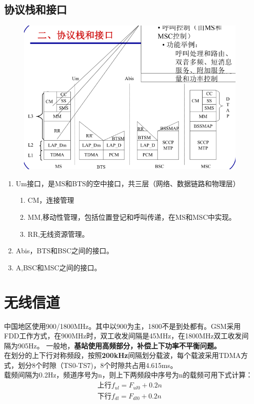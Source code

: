 \subsection{协议栈和接口}
\begin{figure}[H]
	\centering
	\includegraphics[width=0.7\linewidth]{figures/screenshot004}
	\caption{}
	\label{fig:screenshot004}
\end{figure}
\begin{enumerate}
	\item Um接口，是MS和BTS的空中接口，共三层（网络、数据链路和物理层）
	\begin{enumerate}
		\item CM，连接管理
		\item MM,移动性管理，包括位置登记和呼叫传递，在MS和MSC中实现。
		\item RR,无线资源管理。
	\end{enumerate}
	\item Abis，BTS和BSC之间的接口。
	\item A,BSC和MSC之间的接口。
\end{enumerate}
\section{无线信道}
中国地区使用900/1800MHz。其中以900为主，1800不是到处都有。GSM采用FDD工作方式，在900MHz时，双工收发间隔是45MHz，在1800MHz双工收发间隔为905Hz。
一般地，\textbf{基站使用高频部分，补偿上下功率不平衡问题。}\\
在划分的上下行对称频段，按照\textbf{200kHz}间隔划分载波，每个载波采用TDMA方式，划分8个时隙（TS0-TS7)，8个时隙共占用4.615ms。\\
载频间隔为0.2Hz，频道序号为n，则上下两频段中序号为n的载频可用下式计算：
\begin{gather}\label{key}
	\text{上行} f_{ul} = F_{ul0} +0.2n \\
	\text{下行} f_{dl} = F_{dl0} + 0.2n
\end{gather}
